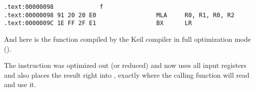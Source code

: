 ﻿\subsectionold{\OptimizingKeilVI (\ARMMode)}

\begin{lstlisting}[label=ARM_leaf_example1]
.text:00000098             f
.text:00000098 91 20 20 E0                 MLA     R0, R1, R0, R2
.text:0000009C 1E FF 2F E1                 BX      LR
\end{lstlisting}


And here is the \ttf function compiled by the Keil compiler in full optimization mode (\Othree).

The \MOV instruction was optimized out (or reduced) and now  uses all 
input registers and also places the result right into ,
exactly where the calling function will read and use it.
